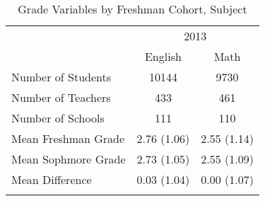 \begin{table}

\caption{\label{tab:table_freq}Grade Variables by Freshman Cohort, Subject}
\centering
\begin{tabular}[t]{lcc}
\toprule
\multicolumn{1}{c}{ } & \multicolumn{2}{c}{2013} \\
\cmidrule(l{3pt}r{3pt}){2-3}{}
  & English & Math\\
\midrule
Number of Students & 10144 & 9730\\
Number of Teachers & 433 & 461\\
Number of Schools & 111 & 110\\
\addlinespace
Mean Freshman Grade & 2.76 (1.06) & 2.55 (1.14)\\
Mean Sophmore Grade & 2.73 (1.05) & 2.55 (1.09)\\
Mean Difference & 0.03 (1.04) & 0.00 (1.07)\\
\bottomrule{}
\end{tabular}
\end{table}
